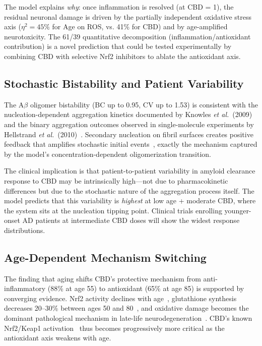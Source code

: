 \documentclass[10pt,letterpaper]{article}
\newcommand{\etal}{\textit{et al.}}
\begin{document}
The model explains \textit{why}: once inflammation is resolved (at CBD = 1), the residual neuronal damage is driven by the partially independent oxidative stress axis ($\eta^2 = 45\%$ for Age on ROS, vs. 41\% for CBD) and by age-amplified neurotoxicity. The 61/39 quantitative decomposition (inflammation/antioxidant contribution) is a novel prediction that could be tested experimentally by combining CBD with selective Nrf2 inhibitors to ablate the antioxidant axis.

\subsection{Stochastic Bistability and Patient Variability}

The A$\beta$ oligomer bistability (BC up to 0.95, CV up to 1.53) is consistent with the nucleation-dependent aggregation kinetics documented by Knowles \etal\ (2009)~\cite{knowles2009} and the binary aggregation outcomes observed in single-molecule experiments by Hellstrand \etal\ (2010)~\cite{hellstrand2010}. Secondary nucleation on fibril surfaces creates positive feedback that amplifies stochastic initial events~\cite{arosio2015}, exactly the mechanism captured by the model's concentration-dependent oligomerization transition.

The clinical implication is that patient-to-patient variability in amyloid clearance response to CBD may be intrinsically high---not due to pharmacokinetic differences but due to the stochastic nature of the aggregation process itself. The model predicts that this variability is \textit{highest} at low age + moderate CBD, where the system sits at the nucleation tipping point. Clinical trials enrolling younger-onset AD patients at intermediate CBD doses will show the widest response distributions.

\subsection{Age-Dependent Mechanism Switching}

The finding that aging shifts CBD's protective mechanism from anti-inflammatory (88\% at age 55) to antioxidant (65\% at age 85) is supported by converging evidence. Nrf2 activity declines with age~\cite{zhang2015nrf2}, glutathione synthesis decreases 20--30\% between ages 50 and 80~\cite{rahimifard2017}, and oxidative damage becomes the dominant pathological mechanism in late-life neurodegeneration~\cite{mattson2018}. CBD's known Nrf2/Keap1 activation~\cite{casares2020} thus becomes progressively more critical as the antioxidant axis weakens with age.
\end{document}
